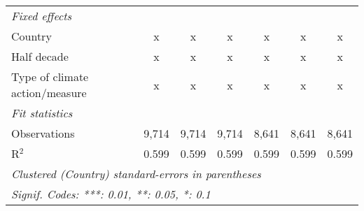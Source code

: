 \begin{tabular}{lcccccc}
   \emph{Fixed effects}\\
   Country                                                   & x             & x             & x             & x            & x            & x\\  
   Half decade                                               & x             & x             & x             & x            & x            & x\\  
   Type of climate action/measure                            & x             & x             & x             & x            & x            & x\\  
   \midrule \emph{Fit statistics}\\
   Observations                                              & 9,714         & 9,714         & 9,714         & 8,641        & 8,641        & 8,641\\  
   R$^2$                                                     & 0.599         & 0.599         & 0.599         & 0.599        & 0.599        & 0.599\\  
   \midrule
   \multicolumn{7}{l}{\emph{Clustered (Country) standard-errors in parentheses}}\\
   \multicolumn{7}{l}{\emph{Signif. Codes: ***: 0.01, **: 0.05, *: 0.1}}\\
\end{tabular}
\par\endgroup


